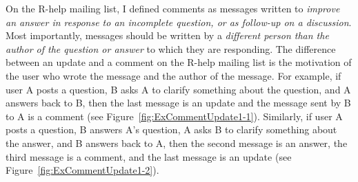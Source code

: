 \documentclass{sig-alternate-05-2015}
\begin{document}
	On the R-help mailing list, I defined comments as messages written to \emph{improve an answer in response to an incomplete question, or as follow-up on a discussion}.
	Most importantly, messages should be written by a \emph{different person than the author of the question or answer} to which they are responding.
	The difference between an update and a comment on the R-help mailing list is the motivation of the user who wrote the message and the author of the message.
	For example, if user A posts a question, B asks A to clarify something about the question, and A answers back to B, then the last message is an update and the message sent by B to A is a comment (see Figure~\ref{fig:ExCommentUpdate1-1}). 
	Similarly, if user A posts a question, B answers A's question, A asks B to clarify something about the answer, and B answers back to A, then the second message is an answer, the third message is a comment, and the last message is an update (see Figure~\ref{fig:ExCommentUpdate1-2}).
\end{document}
